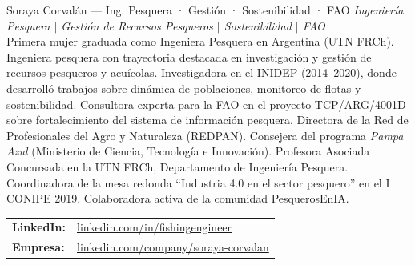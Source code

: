 \documentclass[12pt,a4paper]{article}
\begin{document}
\medskip

\begin{docentebox}[pescateal]{Soraya Corvalán — Ing. Pesquera · Gestión · Sostenibilidad · FAO}
  {\small\itshape\color{pescateal}
    Ingeniería Pesquera $|$ Gestión de Recursos Pesqueros $|$ Sostenibilidad $|$ FAO}\\[5pt]
  Primera mujer graduada como Ingeniera Pesquera en Argentina (UTN FRCh). Ingeniera
  pesquera con trayectoria destacada en investigación y gestión de recursos pesqueros
  y acuícolas. Investigadora en el INIDEP (2014--2020), donde desarrolló trabajos sobre
  dinámica de poblaciones, monitoreo de flotas y sostenibilidad. Consultora experta para la
  FAO en el proyecto TCP/ARG/4001D sobre fortalecimiento del sistema de información
  pesquera. Directora de la Red de Profesionales del Agro y Naturaleza (REDPAN).
  Consejera del programa \textit{Pampa Azul} (Ministerio de Ciencia, Tecnología e
  Innovación). Profesora Asociada Concursada en la UTN FRCh, Departamento de Ingeniería
  Pesquera. Coordinadora de la mesa redonda ``Industria 4.0 en el sector pesquero'' en
  el I CONIPE 2019. Colaboradora activa de la comunidad PesquerosEnIA.\\[7pt]
  \begin{tabular}{@{}ll}
    \textbf{LinkedIn:} & \href{https://www.linkedin.com/in/fishingengineer/}{linkedin.com/in/fishingengineer} \\
    \textbf{Empresa:}  & \href{https://www.linkedin.com/company/soraya-corvalan/}{linkedin.com/company/soraya-corvalan} \\
  \end{tabular}
\end{docentebox}

\medskip
\end{document}
